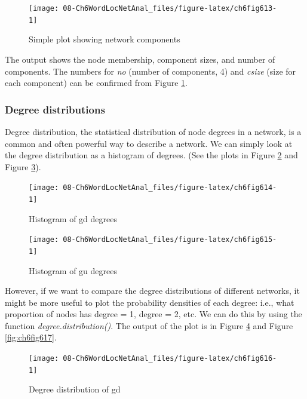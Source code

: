 \documentclass[
]{article}
\begin{document}
\begin{figure}

{\centering \texttt{[image: 08-Ch6WordLocNetAnal\_files/figure-latex/ch6fig613-1]} 

}

\caption{Simple plot showing network components}\label{fig:ch6fig613}
\end{figure}

The output shows the node membership, component sizes, and number of components. The numbers for \emph{no} (number of components, 4) and \emph{csize} (size for each component) can be confirmed from Figure \ref{fig:ch6fig613}.

\hypertarget{degree-distributions}{%
\subsubsection{Degree distributions}\label{degree-distributions}}

Degree distribution, the statistical distribution of node degrees in a network, is a common and often powerful way to describe a network. We can simply look at the degree distribution as a histogram of degrees. (See the plots in Figure \ref{fig:ch6fig614} and Figure \ref{fig:ch6fig615}).

\begin{figure}

{\centering \texttt{[image: 08-Ch6WordLocNetAnal\_files/figure-latex/ch6fig614-1]} 

}

\caption{Histogram of gd degrees}\label{fig:ch6fig614}
\end{figure}

\begin{figure}

{\centering \texttt{[image: 08-Ch6WordLocNetAnal\_files/figure-latex/ch6fig615-1]} 

}

\caption{Histogram of gu degrees}\label{fig:ch6fig615}
\end{figure}

However, if we want to compare the degree distributions of different networks, it might be more useful to plot the probability densities of each degree: i.e., what proportion of nodes has degree = 1, degree = 2, etc. We can do this by using the function \emph{degree.distribution()}. The output of the plot is in Figure \ref{fig:ch6fig616} and Figure \ref{fig:ch6fig617}.

\begin{figure}

{\centering \texttt{[image: 08-Ch6WordLocNetAnal\_files/figure-latex/ch6fig616-1]} 

}

\caption{Degree distribution of gd}\label{fig:ch6fig616}
\end{figure}
\end{document}
